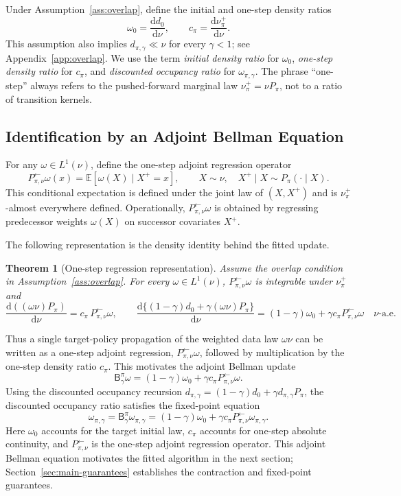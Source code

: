 \documentclass{article}
\newcommand{\E}{\mathbb{E}}
\newcommand{\1}{\mathbf{1}}
\newcommand{\dd}{\mathrm{d}}
\newcommand{\nup}{\nu_\pi^+}
\newcommand{\cpi}{c_\pi}
\newcommand{\omegazero}{\omega_0}
\newcommand{\omegastar}{\omega_{\pi,\gamma}}
\newcommand{\Bpig}{\mathsf{B}_\gamma^\pi}
\newcommand{\Pback}{P_{\pi,\nu}^{\leftarrow}}
\newcommand{\Mpi}{\Pback}
\newcommand{\Ppi}{P_\pi}
\newcommand{\dinit}{d_0}
\theoremstyle{plain}
\newtheorem{theorem}{Theorem}[section]
\theoremstyle{definition}
\theoremstyle{remark}
\begin{document}
Under Assumption~\ref{ass:overlap}, define the initial and one-step density
ratios
\[
    \omegazero=\frac{\dd\dinit}{\dd\nu},
    \qquad
    \cpi=\frac{\dd\nup}{\dd\nu}.
\]
This assumption also implies $d_{\pi,\gamma}\ll\nu$ for every $\gamma<1$; see
Appendix~\ref{app:overlap}. We use the term \emph{initial density ratio} for
$\omegazero$, \emph{one-step density ratio} for $\cpi$, and \emph{discounted
occupancy ratio} for $\omegastar$. The phrase ``one-step'' always refers to the
pushed-forward marginal law $\nup=\nu\Ppi$, not to a ratio of transition kernels.

\subsection{Identification by an Adjoint Bellman Equation}

For any $\omega\in L^1(\nu)$, define the one-step adjoint regression operator
\[
    \Mpi\omega(x)
    =
    \E[\omega(X)\mid X^+=x],
    \qquad
    X\sim\nu,\quad X^+\mid X\sim\Ppi(\cdot\mid X).
\]
This conditional expectation is defined under the joint law of $(X,X^+)$ and is
$\nup$-almost everywhere defined. Operationally, $\Mpi\omega$ is obtained by
regressing predecessor weights $\omega(X)$ on successor covariates $X^+$.

The following representation is the density identity behind the fitted update.
\begin{theorem}[One-step regression representation]
\label{thm:reverse-regression}
Assume the overlap condition in Assumption~\ref{ass:overlap}. For every
$\omega\in L^1(\nu)$, $\Mpi\omega$ is integrable under $\nup$ and
\[
    \frac{\dd((\omega\nu)\Ppi)}{\dd\nu}
    =
    \cpi\,\Mpi\omega,
    \qquad
    \frac{\dd\{(1-\gamma)\dinit+\gamma(\omega\nu)\Ppi\}}{\dd\nu}
    =
    (1-\gamma)\omegazero+\gamma\cpi\Mpi\omega
    \quad \nu\text{-a.e.}
\]
\end{theorem}

Thus a single target-policy propagation of the weighted data law $\omega\nu$
can be written as a one-step adjoint regression, $\Mpi\omega$, followed by
multiplication by the one-step density ratio $\cpi$. This motivates the adjoint
Bellman update
\begin{equation}
\label{eq:operator}
    \Bpig\omega
    =
    (1-\gamma)\omegazero+\gamma\cpi\Mpi\omega .
\end{equation}
Using the discounted occupancy recursion
$d_{\pi,\gamma}=(1-\gamma)\dinit+\gamma d_{\pi,\gamma}\Ppi$, the discounted
occupancy ratio satisfies the fixed-point equation
\begin{equation}
\label{eq:adjoint-bellman}
    \omegastar
    =
    \Bpig\omegastar
    =
    (1-\gamma)\omegazero+\gamma\cpi\Mpi\omegastar .
\end{equation}
Here $\omegazero$ accounts for the target initial law, $\cpi$ accounts for
one-step absolute continuity, and $\Mpi$ is the one-step adjoint regression
operator. This adjoint Bellman equation motivates the fitted algorithm in the
next section; Section~\ref{sec:main-guarantees} establishes the contraction and
fixed-point guarantees.
\end{document}
